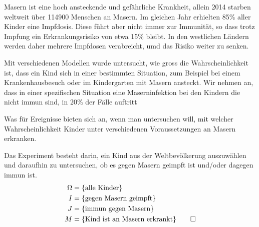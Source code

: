 Masern ist eine hoch ansteckende und gefährliche Krankheit,
allein 2014 starben weltweit über 114900 Menschen an Masern.
Im gleichen Jahr erhielten 85\% aller Kinder eine Impfdosis.
Diese führt aber nicht immer zur Immunität, so dass trotz Impfung
ein Erkrankungsrisiko von etwa 15\% bleibt.
In den westlichen Ländern werden daher mehrere Impfdosen verabreicht,
umd das Risiko weiter zu senken.

Mit verschiedenen Modellen wurde untersucht, wie gross die Wahrscheinlichkeit
ist, dass ein Kind sich in einer bestimmten Situation, zum Beispiel
bei einem Krankenhausbesuch oder im Kindergarten mit Masern ansteckt.
Wir nehmen an, dass in einer spezifischen Situation eine Maserninfektion
bei den Kindern die nicht immun sind, in 20\% der Fälle auftritt

Was für Ereignisse bieten sich an, wenn man untersuchen will, mit welcher
Wahrscheinlichkeit Kinder unter verschiedenen Voraussetzungen
an Masern erkranken.


\begin{loesung}
Das Experiment besteht darin, ein Kind aus der Weltbevölkerung auszuwählen
und daraufhin zu untersuchen, ob es gegen Masern geimpft ist und/oder
dagegen immun ist.
\begin{align*}
\Omega &= \{\text{alle Kinder}\}
\\
I&=\{\text{gegen Masern geimpft}\}
\\
J&=\{\text{immun gegen Masern}\}
\\
M&=\{\text{Kind ist an Masern erkrankt}\}
\qedhere
\end{align*}
\end{loesung}
